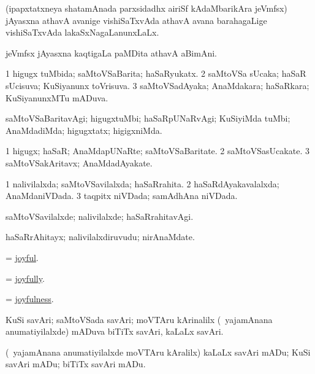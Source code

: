 \bentry
{}
\gl{\gu}
\bmng
(ipapxtatxneya shatamAnada parxsidadhx airiSf kAdaMbarikAra jeVmfsx) jAyasxna athavA avanige vishiSaTxvAda athavA avana barahagaLige vishiSaTxvAda lakaSxNagaLanunxLaLx. 
\emng
\eentry

\bentry
{}
\gl{\nA}
\bmng
jeVmfsx jAyasxna kaqtigaLa paMDita athavA aBimAni. 
\emng
\eentry

\bentry
{}
\gl{\gu}
\bmng
\bnum
\num{1} higugx tuMbida; saMtoVSaBarita; haSaRyukatx. 
\num{2} saMtoVSa sUcaka; haSaR sUcisuva; KuSiyanunx toVrisuva. 
\num{3} saMtoVSadAyaka; AnaMdakara; haSaRkara; KuSiyanunxMTu mADuva. 
\enum
\emng
\eentry

\bentry
{}
\gl{\kirxvi}
\bmng
saMtoVSaBaritavAgi; higugxtuMbi; haSaRpUNaRvAgi; KuSiyiMda tuMbi; AnaMdadiMda; higugxtatx; higigxniMda. 
\emng
\eentry

\bentry
{}
\gl{\nA}
\bmng
\bnum
\num{1} higugx; haSaR; AnaMdapUNaRte; saMtoVSaBaritate. 
\num{2} saMtoVSasUcakate. 
\num{3} saMtoVSakAritavx; AnaMdadAyakate. 
\enum
\emng
\eentry

\bentry
{}
\gl{\gu}
\bmng
\bnum
\num{1} nalivilalxda; saMtoVSavilalxda; haSaRrahita. 
\num{2} haSaRdAyakavalalxda; AnaMdaniVDada. 
\num{3} taqpitx niVDada; samAdhAna niVDada. 
\enum
\emng
\eentry

\bentry
{}
\gl{\kirxvi}
\bmng
saMtoVSavilalxde; nalivilalxde; haSaRrahitavAgi. 
\emng
\eentry

\bentry
{}
\gl{\nA}
\bmng
haSaRrAhitayx; nalivilalxdiruvudu; nirAnaMdate. 
\emng
\eentry

\bentry
{}
\gl{\gu}
\bmng
 = \hyperlink{joyful}{joyful}. 
\emng
\eentry

\bentry
{}
\gl{\kirxvi}
\bmng
 = \hyperlink{joyfully}{joyfully}. 
\emng
\eentry

\bentry
{}
\gl{\nA}
\bmng
 = \hyperlink{joyfulness}{joyfulness}. 
\emng
\eentry

\bentry
{}
\gl{\nA}
\bmng
KuSi savAri; saMtoVSada savAri; moVTAru kArinalilx (\kanmu\ yajamAnana anumatiyilalxde) mADuva biTiTx savAri, kaLaLx savAri. 
\emng
\eentry


\bentry
{}
\gl{\akirx}
\bmng
(\kanmu\ yajamAnana anumatiyilalxde moVTAru kAralilx) kaLaLx savAri mADu; KuSi savAri mADu; biTiTx savAri mADu. 
\emng
\eentry

